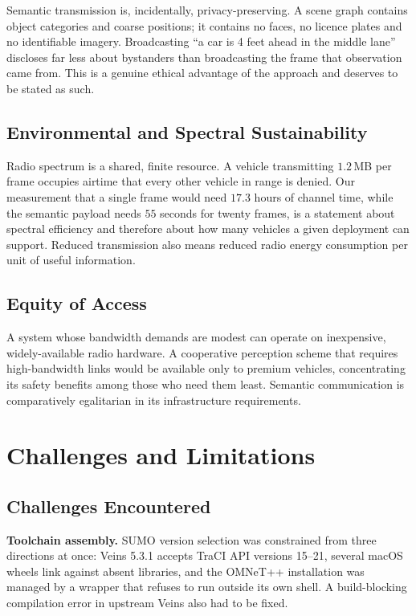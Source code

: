 \documentclass{iutbscthesis}
\begin{document}
Semantic transmission is, incidentally, privacy-preserving. A scene graph
contains object categories and coarse positions; it contains no faces, no
licence plates and no identifiable imagery. Broadcasting ``a car is 4 feet
ahead in the middle lane'' discloses far less about bystanders than
broadcasting the frame that observation came from. This is a genuine ethical
advantage of the approach and deserves to be stated as such.

\section{Environmental and Spectral Sustainability}

Radio spectrum is a shared, finite resource. A vehicle transmitting $1.2$\,MB
per frame occupies airtime that every other vehicle in range is denied. Our
measurement that a single frame would need $17.3$ hours of channel time, while
the semantic payload needs $55$ seconds for twenty frames, is a statement about
spectral efficiency and therefore about how many vehicles a given deployment
can support. Reduced transmission also means reduced radio energy consumption
per unit of useful information.

\section{Equity of Access}

A system whose bandwidth demands are modest can operate on inexpensive,
widely-available radio hardware. A cooperative perception scheme that requires
high-bandwidth links would be available only to premium vehicles, concentrating
its safety benefits among those who need them least. Semantic communication is
comparatively egalitarian in its infrastructure requirements.

\chapter{Challenges and Limitations} \label{chapter:limits}

\section{Challenges Encountered}

\textbf{Toolchain assembly.} SUMO version selection was constrained from three
directions at once: Veins 5.3.1 accepts TraCI API versions 15--21, several
macOS wheels link against absent libraries, and the OMNeT++ installation was
managed by a wrapper that refuses to run outside its own shell. A build-blocking
compilation error in upstream Veins also had to be fixed.
\end{document}
